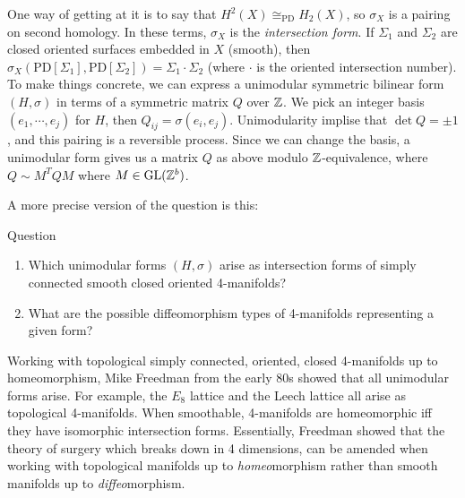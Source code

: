 One way of getting at it is to say that $H^2(X) \cong_{\mathrm{PD}} H_2(X)$, so $\sigma_X$ is a pairing on second homology. In these terms, $\sigma_X$ is the \emph{intersection form}. If $\Sigma_1$ and $\Sigma_2$ are closed oriented surfaces embedded in $X$ (smooth), then $\sigma_X (\mathrm{PD}[\Sigma_1],\mathrm{PD}[\Sigma_2]) = \Sigma_1 \cdot \Sigma_2$ (where $\cdot $ is the oriented intersection number). To make things concrete, we can express a unimodular symmetric bilinear form $(H, \sigma)$ in terms of a symmetric matrix $Q$ over $\mathbb{Z}$. We pick an integer basis $(e_1, \cdots ,e_j )$ for $H$, then $Q_{ij}=\sigma(e_i ,e_j )$. Unimodularity implise that $\det Q = \pm 1$, and this pairing is a reversible process. Since we can change the basis, a unimodular form gives us a matrix $Q$ as above modulo  $\mathbb{Z}$-equivalence, where $Q \sim M^T Q M$ where $M \in  \mathrm{GL}(\mathbb{Z}^b) $.

A more precise version of the question is this:
\begin{namedthing}{Question} 
    \begin{enumerate}[label=(\roman*)]
    \setlength\itemsep{-.2em}
        \item Which unimodular forms $(H,\sigma)$ arise as intersection forms of simply connected smooth closed oriented 4-manifolds?
        \item What are the possible diffeomorphism types of 4-manifolds representing a given form?
    \end{enumerate}
\end{namedthing}
Working with topological simply connected, oriented, closed 4-manifolds up to homeomorphism, Mike Freedman from the early 80s showed that all unimodular forms arise. For example, the $E_8$ lattice and the Leech lattice all arise as topological 4-manifolds. When smoothable, 4-manifolds are homeomorphic iff they have isomorphic intersection forms. Essentially, Freedman showed that the theory of surgery which breaks down in 4 dimensions, can be amended when working with topological manifolds up to \emph{homeo}morphism rather than smooth manifolds up to \emph{diffeo}morphism.

